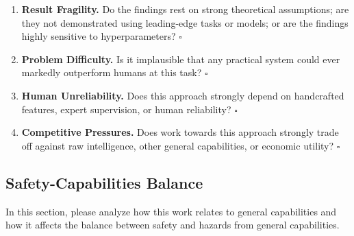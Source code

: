 \begin{enumerate}
\item \textbf{Result Fragility.} Do the findings rest on strong theoretical assumptions; are they not demonstrated using leading-edge tasks or models; or are the findings highly sensitive to hyperparameters? \hfill
$\square$
\item \textbf{Problem Difficulty.} Is it implausible that any practical system could ever markedly outperform humans at this task? \hfill $\square$
\item \textbf{Human Unreliability.} Does this approach strongly depend on handcrafted features, expert supervision, or human reliability? \hfill $\square$
\item \textbf{Competitive Pressures.} Does work towards this approach strongly trade off against raw intelligence, other general capabilities, or economic utility? \hfill $\square$
\end{enumerate}

\subsection{Safety-Capabilities Balance}
In this section, please analyze how this work relates to general capabilities and how it affects the balance between safety and hazards from general capabilities.

